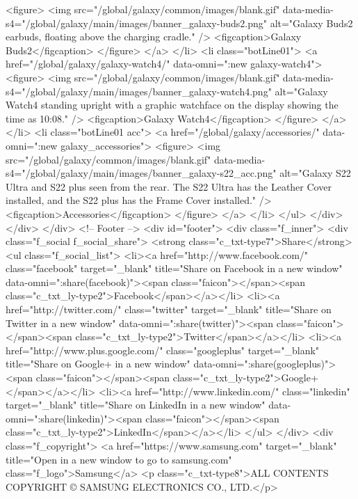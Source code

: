 {{{{{{{{{{{{{{{{{{{{{{{{{{{{{{{{{{{{{{{{{{{{{{{{{{{{{							<figure>
								<img src="/global/galaxy/common/images/blank.gif" data-media-s4="/global/galaxy/main/images/banner_galaxy-buds2.png" alt="Galaxy Buds2 earbuds, floating above the charging cradle." />
								<figcaption>Galaxy Buds2</figcaption>
							</figure>
						</a>
					</li>
					<li class="botLine01">
						<a href="/global/galaxy/galaxy-watch4/" data-omni=":new galaxy-watch4">
							<figure>
								<img src="/global/galaxy/common/images/blank.gif" data-media-s4="/global/galaxy/main/images/banner_galaxy-watch4.png" alt="Galaxy Watch4 standing upright with a graphic watchface on the display showing the time as 10:08." />
								<figcaption>Galaxy Watch4</figcaption>
							</figure>
						</a>
					</li>
					<li class="botLine01 acc">
						<a href="/global/galaxy/accessories/" data-omni=":new galaxy_accessories">
							<figure>
								<img src="/global/galaxy/common/images/blank.gif" data-media-s4="/global/galaxy/main/images/banner_galaxy-s22_acc.png" alt="Galaxy S22 Ultra and S22 plus seen from the rear. The S22 Ultra has the Leather Cover installed, and the S22 plus has the Frame Cover installed." />
								<figcaption>Accessories</figcaption>
							</figure>
						</a>
					</li>
				</ul>
			</div>
		</div>
	</div>
	<!-- Footer -->
	<div id="footer">
		<div class="f_inner">
			<div class="f_social f_social_share">
				<strong class="c_txt-type7">Share</strong>
				<ul class="f_social_list">
					<li><a href="http://www.facebook.com/" class="facebook" target="_blank" title="Share on Facebook in a new window" data-omni=":share(facebook)"><span class="faicon"></span><span class="c_txt_ly-type2">Facebook</span></a></li>
					<li><a href="http://twitter.com/" class="twitter" target="_blank" title="Share on Twitter in a new window" data-omni=":share(twitter)"><span class="faicon"></span><span class="c_txt_ly-type2">Twitter</span></a></li>
					<li><a href="http://www.plus.google.com/" class="googleplus" target="_blank" title="Share on Google+ in a new window" data-omni=":share(googleplus)"><span class="faicon"></span><span class="c_txt_ly-type2">Google+</span></a></li>
					<li><a href="http://www.linkedin.com/" class="linkedin" target="_blank" title="Share on LinkedIn in a new window" data-omni=":share(linkedin)"><span class="faicon"></span><span class="c_txt_ly-type2">LinkedIn</span></a></li>
				</ul>
			</div>
			<div class="f_copyright">
				<a href="https://www.samsung.com" target="_blank" title="Open in a new window to go to samsung.com" class="f_logo">Samsung</a>
				<p class="c_txt-type8">ALL CONTENTS COPYRIGHT © SAMSUNG ELECTRONICS CO., LTD.</p>
}}}}}}}}}}}}}}}}}}}}}}}}}}}}}}}}}}}}}}}}}}}}}}}}}}}}}
